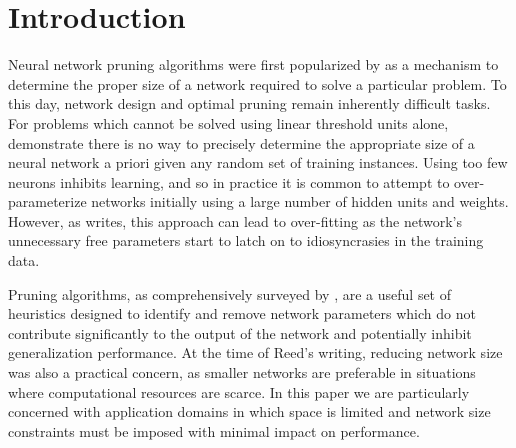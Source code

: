 \section{Introduction}
Neural network pruning algorithms were first popularized by \cite{sietsma1988neural} as a mechanism to determine the proper size of a network required to solve a particular problem. To this day, network design and optimal pruning remain inherently difficult tasks. For problems which cannot be solved using linear threshold units alone, \cite{baum1989size} demonstrate there is no way to precisely determine the appropriate size of a neural network a priori given any random set of training instances. Using too few neurons inhibits learning, and so in practice it is common to attempt to over-parameterize networks initially using a large number of hidden units and weights. However, as \cite{chauvin1990generalization} writes, this approach can lead to over-fitting as the network's unnecessary free parameters start to latch on to idiosyncrasies in the training data. 


Pruning algorithms, as comprehensively surveyed by \cite{reed1993pruning}, are a useful set of heuristics designed to identify and remove network parameters which do not contribute significantly to the output of the network and potentially inhibit generalization performance. At the time of Reed's writing, reducing network size was also a practical concern, as smaller networks are preferable in situations where computational resources are scarce. In this paper we are particularly concerned with application domains in which space is limited and network size constraints must be imposed with minimal impact on performance.



